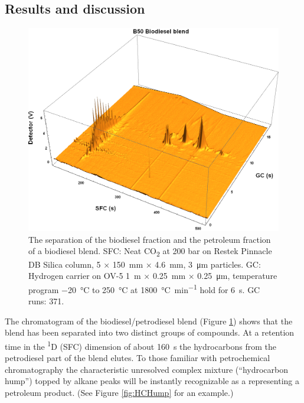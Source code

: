 \subsection{Results and discussion}
\label{sec:B50Discuss}
\begin{figure}
	\centering
	\includegraphics[width=\textwidth]{Figures/B50.png}
	\decoRule	
	
\caption[Biodiesel separated from petrodiesel.]{The separation of the biodiesel
fraction and the petroleum fraction of a biodiesel blend. SFC: Neat
CO\textsubscript{2} at 200 bar on Restek Pinnacle DB Silica column, 5 × \SI{150}{\milli\metre} ×
\SI{4.6}{\milli\metre}, \SI{3}{\micro\metre} particles. GC: Hydrogen carrier on
OV-5 \SI{1}{\metre} × \SI{0.25}{\milli\metre} × \SI{0.25}{\micro\metre},
temperature program \SI{-20}{\celsius} to \SI{250}{\celsius} at
\SI{1800}{\celsius\per\minute} hold for \SI{6}{\second}. GC runs: 371.}

	
	\label{fig:B50} 
\end{figure}

The chromatogram of the biodiesel/petrodiesel blend (Figure \ref{fig:B50}) shows
that the blend has been separated into two distinct groups of compounds. At a
retention time in the \textsuperscript{1}D (SFC) dimension of about
\SI{160}{\second} the hydrocarbons from the petrodiesel part of the blend
elutes. To those familiar with petrochemical chromatography the characteristic
unresolved complex mixture (``hydrocarbon hump'') topped by alkane peaks will be
instantly recognizable as a representing a petroleum product. (See Figure
\ref{fig:HCHump} for an example.)


